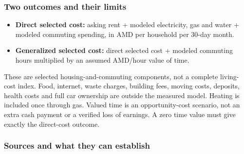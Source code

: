 \documentclass[
]{article}
\providecommand{\tightlist}{%
  \setlength{\itemsep}{0pt}\setlength{\parskip}{0pt}}
\begin{document}
\subsubsection{Two outcomes and their
limits}\label{two-outcomes-and-their-limits}

\begin{itemize}
\tightlist
\item
  \textbf{Direct selected cost:} asking rent + modeled electricity, gas
  and water + modeled commuting spending, in AMD per household per
  30-day month.
\item
  \textbf{Generalized selected cost:} direct selected cost + modeled
  commuting hours multiplied by an assumed AMD/hour value of time.
\end{itemize}

These are selected housing-and-commuting components, not a complete
living-cost index. Food, internet, waste charges, building fees, moving
costs, deposits, health costs and full car ownership are outside the
measured model. Heating is included once through gas. Valued time is an
opportunity-cost scenario, not an extra cash payment or a verified loss
of earnings. A zero time value must give exactly the direct-cost
outcome.

\subsubsection{Sources and what they can
establish}\label{sources-and-what-they-can-establish}
\end{document}

